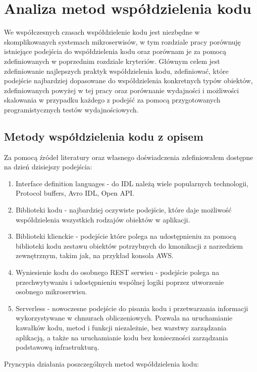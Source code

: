 \documentclass[runningheads,12pt]{llncs}
\begin{document}
\newpage

\section{Analiza metod współdzielenia kodu}

We współczesnych czasach współdzielenie kodu jest niezbędne w skomplikowanych systemach mikroserwisów, w tym rozdziale pracy porównuję istniejące podejścia do współdzielenia kodu oraz porównam je za pomocą zdefiniowanych w poprzednim rozdziale kryteriów. Głównym celem jest zdefiniowanie najlepszych praktyk współdzielenia kodu, zdefiniować, które podejście najbardziej dopasowane do współdzielenia konkretnych typów obiektów, zdefiniowanych powyżej w tej pracy oraz porównanie wydajności i możliwości skalowania w przypadku każdego z podejść za pomocą przygotowanych programistycznych testów wydajnościowych.

\subsection{Metody współdzielenia kodu z opisem}

Za pomocą źródeł literatury oraz własnego doświadczenia zdefiniowałem dostępne na dzień dzisiejszy podejścia:

\begin{enumerate}
    \item Interface definition languages - do IDL należą wiele popularnych technologii, Protocol buffers, Avro IDL, Open API. ~\cite{wiki:interface_description_language}
    \item Biblioteki kodu - najbardziej oczywiste podejście, które daje możliwość współdzielenia wszystkich rodzajów obiektów w aplikacji.
    \item Biblioteki klienckie - podejście które polega na udostępnieniu za pomocą biblioteki kodu zestawu obiektów potrzybnych do kmonikacji z narzedziem zewnętrznym, takim jak, na przykład konsola AWS.
    \item Wyniesienie kodu do osobnego REST serwisu - podejście polega na przechwytywaniu i udostępnieniu wspólnej logiki poprzez utworzenie osobnego mikroserwisu.
    \item Serverless - nowoczesne podejście do pisania kodu i przetwarzania informacji wykorzystywane w chmurach obliczeniowych. Pozwala na uruchamianie kawałków kodu, metod i funkcji niezależnie, bez warstwy zarządzania aplikacją, a także na uruchamianie kodu bez konieczności zarządzania podstawową infrastrukturą. ~\cite{ibm_serverless}
\end{enumerate}
Pryncypia działania poszczególnych metod współdzielenia kodu:
\end{document}
